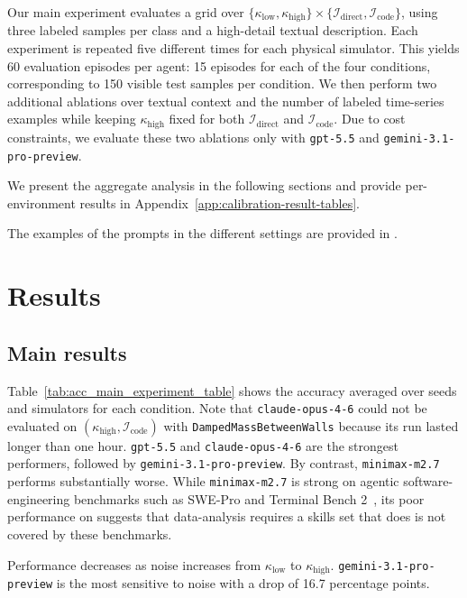Our main experiment evaluates a grid over \(\{\kappa_{\mathrm{low}}, \kappa_{\mathrm{high}}\} \times \{\mathcal{I}_{\mathrm{direct}}, \mathcal{I}_{\mathrm{code}}\}\), using three labeled samples per class and a high-detail textual description.
Each experiment is repeated five different times for each physical simulator.
This yields 60 evaluation episodes per agent: 15 episodes for each of the four conditions, corresponding to 150 visible test samples per condition.
We then perform two additional ablations over textual context and the number of labeled time-series examples while keeping \(\kappa_{\mathrm{high}}\) fixed for both \(\mathcal{I}_{\mathrm{direct}}\) and \(\mathcal{I}_{\mathrm{code}}\).
Due to cost constraints, we evaluate these two ablations only with \texttt{gpt-5.5} and \texttt{gemini-3.1-pro-preview}.

We present the aggregate analysis in the following sections and provide per-environment results in Appendix~\ref{app:calibration-result-tables}.

The examples of the prompts in the different settings are provided in .


\section{Results}
\subsection{Main results}
Table~\ref{tab:acc_main_experiment_table} shows the accuracy averaged over seeds and simulators for each condition. 
Note that \texttt{claude-opus-4-6} could not be evaluated on \((\kappa_{\mathrm{high}}, \mathcal{I}_{\mathrm{code}})\) with \texttt{DampedMassBetweenWalls} because its run lasted longer than one hour.
\texttt{gpt-5.5} and \texttt{claude-opus-4-6} are the strongest performers, followed by \texttt{gemini-3.1-pro-preview}. 
By contrast, \texttt{minimax-m2.7} performs substantially worse.  While \texttt{minimax-m2.7} is strong on agentic software-engineering benchmarks such as SWE-Pro and Terminal Bench 2~\citep{minimax_m27_report_2026}, its poor performance on \name{} suggests that data-analysis requires a skills set that does is not covered by these benchmarks.

Performance decreases as noise increases from \(\kappa_{\mathrm{low}}\) to \(\kappa_{\mathrm{high}}\).
\texttt{gemini-3.1-pro-preview} is the most sensitive to noise with a drop of 16.7 percentage points.

